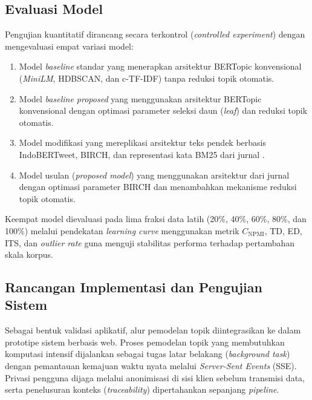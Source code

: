 \subsection{Evaluasi Model}
\label{subsec:model-evaluation}

Pengujian kuantitatif dirancang secara terkontrol (\textit{controlled experiment}) dengan mengevaluasi empat variasi model:

\begin{enumerate}[label=\arabic*., leftmargin=*, itemsep=2pt]
	\item Model \textit{baseline} standar yang menerapkan arsitektur BERTopic konvensional (\textit{MiniLM}, HDBSCAN, dan c-TF-IDF) tanpa reduksi topik otomatis.
	\item Model \textit{baseline proposed} yang menggunakan arsitektur BERTopic konvensional dengan optimasi parameter seleksi daun (\textit{leaf}) dan reduksi topik otomatis.
	\item Model modifikasi yang mereplikasi arsitektur teks pendek berbasis IndoBERTweet, BIRCH, dan representasi kata BM25 dari jurnal \cite{iaes2025indobert}.
	\item Model usulan (\textit{proposed model}) yang menggunakan arsitektur dari jurnal \cite{iaes2025indobert} dengan optimasi parameter BIRCH dan menambahkan mekanisme reduksi topik otomatis.
\end{enumerate}

Keempat model dievaluasi pada lima fraksi data latih (20\%, 40\%, 60\%, 80\%, dan 100\%) melalui pendekatan \textit{learning curve} menggunakan metrik $C_{\text{NPMI}}$, TD, ED, ITS, dan \textit{outlier rate} guna menguji stabilitas performa terhadap pertambahan skala korpus.

\subsection{Rancangan Implementasi dan Pengujian Sistem}
\label{subsec:system-implementation}

Sebagai bentuk validasi aplikatif, alur pemodelan topik diintegrasikan ke dalam prototipe sistem berbasis web. Proses pemodelan topik yang membutuhkan komputasi intensif dijalankan sebagai tugas latar belakang (\textit{background task}) dengan pemantauan kemajuan waktu nyata melalui \textit{Server-Sent Events} (SSE). Privasi pengguna dijaga melalui anonimisasi di sisi klien sebelum transmisi data, serta penelusuran konteks (\textit{traceability}) dipertahankan sepanjang \textit{pipeline}.

